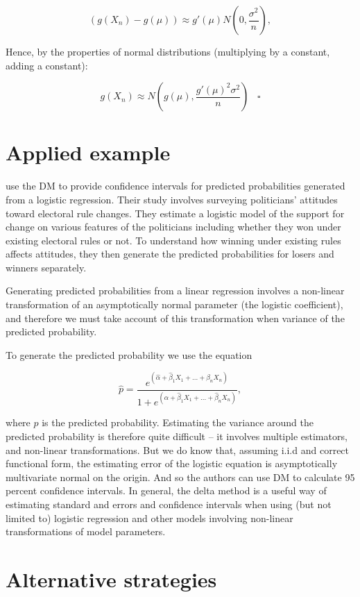 \documentclass[
]{book}
\begin{document}
\[
\left(g(X_n) - g(\mu)\right) \approx g'(\mu)N(0,\frac{\sigma^2}{n}),
\]

Hence, by the properties of normal distributions (multiplying by a constant, adding a constant):

\[
g(X_n) \approx N\left(g(\mu),\frac{g'(\mu)^2\sigma^2}{n}\right) \;\;\; \square
\]

\hypertarget{applied-example}{%
\section{Applied example}\label{applied-example}}

\citet{bowleretal_2006} use the DM to provide confidence intervals for predicted probabilities generated from a logistic regression. Their study involves surveying politicians' attitudes toward electoral rule changes. They estimate a logistic model of the support for change on various features of the politicians including whether they won under existing electoral rules or not. To understand how winning under existing rules affects attitudes, they then generate the predicted probabilities for losers and winners separately.

Generating predicted probabilities from a linear regression involves a non-linear transformation of an asymptotically normal parameter (the logistic coefficient), and therefore we must take account of this transformation when variance of the predicted probability.

To generate the predicted probability we use the equation

\[
\hat{p} = \frac{e^{(\hat{\alpha} + \hat{\beta}_1X_1 +...+\beta_nX_n)}}{1+e^{(\hat{\alpha} + \hat{\beta}_1X_1 + ...+\hat{\beta}_nX_n)}},
\]

where \(\hat{p}\) is the predicted probability. Estimating the variance around the predicted probability is therefore quite difficult -- it involves multiple estimators, and non-linear transformations. But we do know that, assuming i.i.d and correct functional form, the estimating error of the logistic equation is asymptotically multivariate normal on the origin. And so the authors can use DM to calculate 95 percent confidence intervals. In general, the delta method is a useful way of estimating standard and errors and confidence intervals when using (but not limited to) logistic regression and other models involving non-linear transformations of model parameters.

\hypertarget{alternative-strategies}{%
\section{Alternative strategies}\label{alternative-strategies}}
\end{document}
